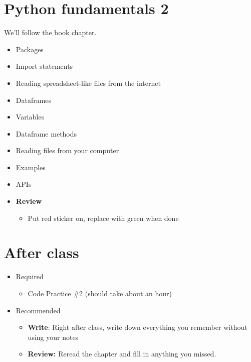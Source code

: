 \documentclass[11pt]{article}
\begin{document}
\section*{Python fundamentals 2}

We'll follow the book chapter.
\begin{itemize}
\item Packages 
\item Import statements 
\item Reading spreadsheet-like files from the internet
\item Dataframes 
\item Variables 
\item Dataframe methods 
\item Reading files from your computer 
\item Examples 
\item APIs 
\item {\bf Review}
\begin{itemize}
\item Put red sticker on, replace with green when done
\end{itemize}
\end{itemize}

\section*{After class}

\begin{itemize}
\item Required
\begin{itemize}
\item Code Practice \#2 (should take about an hour)
\end{itemize}
\item Recommended
\begin{itemize}
\item {\bf Write}:  Right after class, write down everything you remember without using your notes
\item {\bf Review:} Reread the chapter and fill in anything you missed.
\end{itemize}
\end{itemize}


\end{document}
